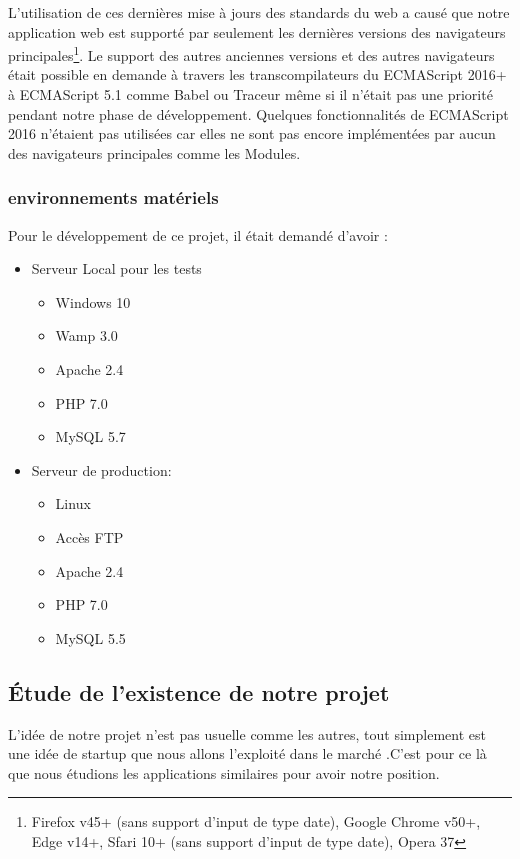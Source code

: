 L'utilisation de ces dernières mise à jours des standards du web a causé que
notre application web est supporté par seulement les dernières versions des
navigateurs principales\footnote{Firefox v45+ (sans support d'input de type
date), Google Chrome v50+, Edge v14+, Sfari 10+ (sans support d'input de type
date), Opera 37}. Le support des autres anciennes versions et des autres
navigateurs était possible en demande à travers les transcompilateurs du
ECMAScript 2016+ à ECMAScript 5.1 comme Babel ou Traceur même si il n'était pas
une priorité pendant notre phase de développement.  Quelques fonctionnalités de
ECMAScript 2016 n'étaient pas utilisées car elles ne sont pas encore
implémentées par aucun des navigateurs principales comme les Modules.

\subsubsection{environnements matériels}

Pour le développement de ce projet, il était demandé d'avoir :
\begin{itemize}
 \item Serveur Local pour les tests
     \begin{itemize}
         \item Windows 10
         \item Wamp 3.0
         \item Apache 2.4
         \item PHP 7.0
         \item MySQL 5.7
     \end{itemize}
 \item Serveur de production:
     \begin{itemize}
      \item Linux
      \item Accès FTP
      \item Apache 2.4
      \item PHP 7.0
      \item MySQL 5.5
     \end{itemize}
\end{itemize}
\subsection{Étude de l'existence de notre projet}
L'idée de notre projet n'est pas usuelle comme les autres, tout simplement est une idée de startup que 
nous allons l'exploité dans le marché .C'est pour ce là que nous étudions les applications similaires 
pour avoir notre position.
